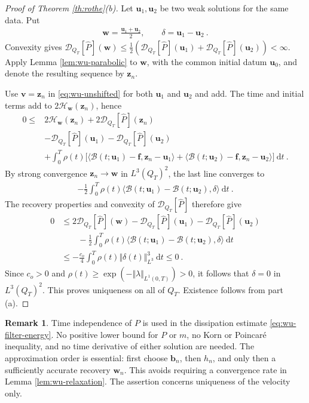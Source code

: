 \documentclass{article}
\theoremstyle{definition}
\newtheorem{remark}[definition]{Remark}
\newcommand{\bfu}{\boldsymbol{u}}
\newcommand{\bfv}{\boldsymbol{v}}
\newcommand{\bfw}{\boldsymbol{w}}
\newcommand{\bff}{\boldsymbol{f}}
\newcommand{\D}{\mathcal{D}}
\newcommand{\dd}{\:\mathrm{d}}
\newcommand{\B}{\mathcal{B}}
\newcommand{\bfz}{\boldsymbol{z}}
\newcommand{\Hh}{\mathcal{H}}
\begin{document}
\begin{proof}[Proof of Theorem \ref{th:rothe}(b)]
Let $\bfu_1,\bfu_2$ be two weak solutions for the same data. Put
\begin{align*}
 \bfw=\frac{\bfu_1+\bfu_2}{2},\qquad\delta=\bfu_1-\bfu_2 \ .
\end{align*}
Convexity gives $\D_{Q_T}[\hat P](\bfw)\leq\frac{1}{2}(\D_{Q_T}[\hat P](\bfu_1)+\D_{Q_T}[\hat P](\bfu_2))<\infty$.
Apply Lemma \ref{lem:wu-parabolic} to $\bfw$, with the common initial datum
$\bfu_0$, and denote the resulting sequence by $\bfz_n$.

Use $\bfv=\bfz_n$ in \eqref{eq:wu-unshifted} for both $\bfu_1$ and $\bfu_2$ and add.
The time and initial terms add to $2\Hh_{\bfw}(\bfz_n)$, hence
\begin{align*}
 0\leq{}&2\Hh_{\bfw}(\bfz_n)+2\D_{Q_T}[\hat P](\bfz_n)\\
 &-\D_{Q_T}[\hat P](\bfu_1)-\D_{Q_T}[\hat P](\bfu_2)\\
 &+\int_0^T\rho(t)\Big[
       \langle\B(t;\bfu_1)-\bff,\bfz_n-\bfu_1\rangle
       +\langle\B(t;\bfu_2)-\bff,\bfz_n-\bfu_2\rangle\Big]\dd t \ .
\end{align*}
By strong convergence $\bfz_n\rightarrow \bfw$ in $L^3(Q_T)^2$, the last line converges to
\begin{align*}
 -\frac{1}{2}\int_0^T\rho(t)
       \langle\B(t;\bfu_1)-\B(t;\bfu_2),\delta\rangle\dd t \ .
\end{align*}
The recovery properties and convexity of $\D_{Q_T}[\hat P]$ therefore give
\begin{align*}
 0
 &\leq 2\D_{Q_T}[\hat P](\bfw)-\D_{Q_T}[\hat P](\bfu_1)-\D_{Q_T}[\hat P](\bfu_2)\\
 &\qquad-\frac{1}{2}\int_0^T\rho(t)
           \langle\B(t;\bfu_1)-\B(t;\bfu_2),\delta\rangle\dd t\\
 &\leq-\frac{c_o}{4}\int_0^T\rho(t)\Vert\delta(t)\Vert_{L^3}^3\dd t
 \leq0 \ .
\end{align*}
Since $c_o>0$ and $\rho(t)\geq \exp(-\Vert\lambda\Vert_{L^1(0,T)})>0$, it follows that
$\delta=0$ in $L^3(Q_T)^2$. This proves uniqueness on all of $Q_T$. Existence follows from part (a).
\end{proof}

\begin{remark}
Time independence of $P$ is used in the dissipation estimate
\eqref{eq:wu-filter-energy}. No positive lower bound for $P$ or $m$, no
Korn or Poincar\'e inequality, and no time derivative of either solution
are needed. The approximation order is essential: first choose $\boldsymbol{b}_n$,
then $h_n$, and only then a sufficiently accurate recovery $\bfw_n$.
This avoids requiring a convergence rate in Lemma \ref{lem:wu-relaxation}.
The assertion concerns uniqueness of the velocity only.
\end{remark}
\end{document}
